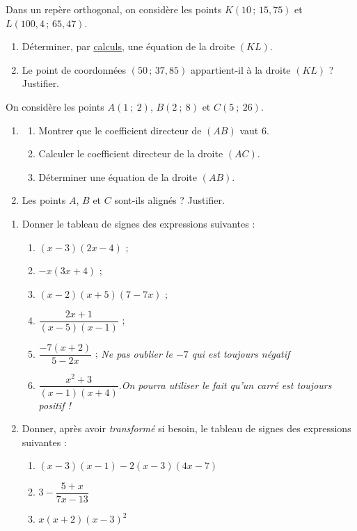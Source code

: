 \documentclass[a4paper,11pt]{article}
\begin{document}
\medskip


\medskip

Dans un repère orthogonal, on considère les points $K(10\,;\,15,75)$ et $L(100,4\,;\,65,47)$.
%
\begin{enumerate}
	\item Déterminer, par \uline{calculs}, une équation de la droite $(KL)$.
	\item Le point de coordonnées $(50\,;\,37,85)$ appartient-il à la droite $(KL)$ ? Justifier.
\end{enumerate}

\newpage


\medskip

On considère les points $A(1~;~2)$, $B(2~;~8)$ et $C(5~;~26)$.
%
\begin{enumerate}
	\item
	\begin{enumerate}
		\item Montrer que le coefficient directeur de $(AB)$ vaut 6.
		\item Calculer le coefficient directeur de la droite $(AC)$.
		\item Déterminer une équation de la droite $(AB)$.
	\end{enumerate}
	\item Les points $A$, $B$ et $C$ sont-ils alignés ? Justifier.
\end{enumerate}

\medskip


\begin{enumerate}
	\item Donner le tableau de signes des expressions suivantes :
	\begin{enumerate}
		\item $(x-3)(2x-4)$ ;
		\item $-x(3x+4)$ ;
		\item $(x-2)(x+5)(7-7x)$ ;
		\item $\dfrac{2x+1}{(x-5)(x-1)}$ ;
		\item $\dfrac{-7(x+2)}{5-2x}$ ; \hfill{}{\footnotesize \textit{Ne pas oublier le $-7$ qui est  \og toujours négatif \fg}}
		\item $\dfrac{x^2+3}{(x-1)(x+4)}$.\hfill{}{\footnotesize \textit{On pourra utiliser le fait qu'un \og carré est toujours positif ! \fg}}
	\end{enumerate}
	\item Donner, après avoir \textit{transformé} si besoin, le tableau de signes des expressions suivantes :
	\begin{enumerate}
		\item $(x-3)(x-1) -2(x-3)(4x-7)$
		\item $3-\dfrac{5+x}{7x-13}$
		\item $x(x+2)(x-3)^2$
	\end{enumerate}
\end{enumerate}
\end{document}
